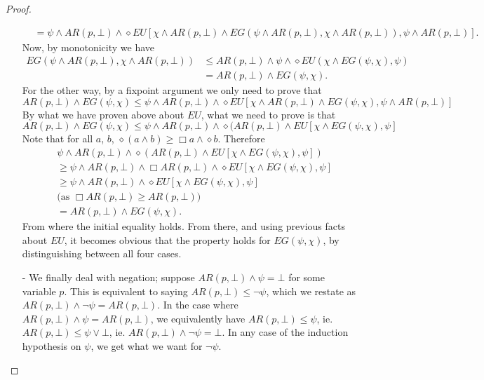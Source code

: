 \documentclass[10pt]{article}
\newcommand{\ARp}{{AR(p,\bot)}}
\begin{document}
\begin{proof}
\begin{itemize}
\begin{align*}
            &=\psi\wedge\ARp\wedge\diamond EU[\chi\wedge\ARp\wedge EG(\psi\wedge\ARp,\chi\wedge\ARp),\psi\wedge\ARp].
        \end{align*}
        Now, by monotonicity we have 
        \begin{align*}
            EG(\psi\wedge\ARp,\chi\wedge\ARp)&\leq \ARp\wedge\psi\wedge\diamond EU(\chi\wedge EG(\psi,\chi),\psi)\\
            &=\ARp\wedge EG(\psi,\chi).
        \end{align*}
        For the other way, by a fixpoint argument we only need to prove that \[\ARp\wedge EG(\psi,\chi)\leq \psi\wedge\ARp\wedge \diamond EU[\chi\wedge\ARp\wedge EG(\psi,\chi),\psi\wedge\ARp]\]
        By what we have proven above about $EU$, what we need to prove is that \[\ARp\wedge EG(\psi,\chi)\leq \psi\wedge\ARp\wedge \diamond (\ARp\wedge EU[\chi\wedge EG(\psi,\chi),\psi]\]
        Note that for all $a$, $b$, $\diamond(a\wedge b)\geq\Box a\wedge \diamond b$.
        Therefore
        \begin{align*}
            &\psi\wedge\ARp\wedge\diamond (\ARp\wedge EU[\chi\wedge EG(\psi,\chi),\psi])\\
            &\geq \psi\wedge\ARp\wedge\Box\ARp\wedge\diamond EU[\chi\wedge EG(\psi,\chi),\psi]\\
            &\geq\psi\wedge\ARp\wedge\diamond EU[\chi\wedge EG(\psi,\chi),\psi]\\
            &\mbox{(as $\Box\ARp\geq\ARp$)}\\
            &=\ARp\wedge EG(\psi,\chi).
        \end{align*}
        From where the initial equality holds. From there, and using previous facts about $EU$, it becomes obvious that the property holds for $EG(\psi,\chi)$, by distinguishing between all four cases.
        \item[-] We finally deal with negation; suppose $\ARp\wedge\psi=\bot$ for some variable $p$. This is equivalent to saying $\ARp\leq\neg\psi$, which we restate as $\ARp\wedge\neg\psi=\ARp$. In the case where $\ARp\wedge\psi=\ARp$, we equivalently have $\ARp\leq\psi$, ie. $\ARp\leq\psi\vee\bot$, ie. $\ARp\wedge\neg\psi=\bot$. In any case of the induction hypothesis on $\psi$, we get what we want for $\neg\psi$.
        \end{itemize}
\end{proof}
\end{document}
